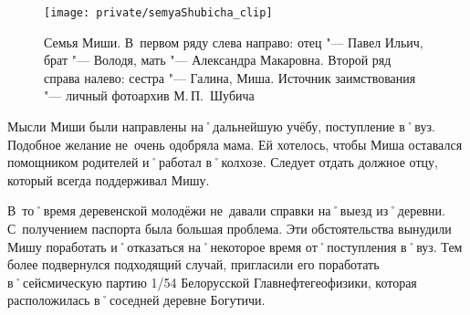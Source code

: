 \begin{figure}[h]
\texttt{[image: private/semyaShubicha\_clip]}
\caption{Семья Миши. В~первом ряду слева направо: отец "--- Павел Ильич, брат "--- Володя, мать "--- Александра Макаровна. Второй ряд справа налево: сестра "--- Галина, Миша. Источник заимствования "--- личный фотоархив М.\,П.~Шубича}
\label{fig:semyaShubicha}
\end{figure}

Мысли Миши были направлены на˚дальнейшую учёбу, поступление в˚вуз. Подобное желание не~очень одобряла мама. Ей хотелось, чтобы Миша оставался помощником родителей и˚работал в˚колхозе. Следует отдать должное отцу, который всегда поддерживал Мишу. 

В~то˚время деревенской молодёжи не~давали справки на˚выезд из˚деревни. С~получением паспорта была большая проблема. Эти обстоятельства вынудили Мишу поработать и˚отказаться на˚некоторое время от˚поступления в˚вуз. Тем более подвернулся подходящий случай, пригласили его поработать в˚сейсмическую партию 1/54 Белорусской Главнефтегеофизики, которая расположилась в˚соседней деревне Богутичи.

